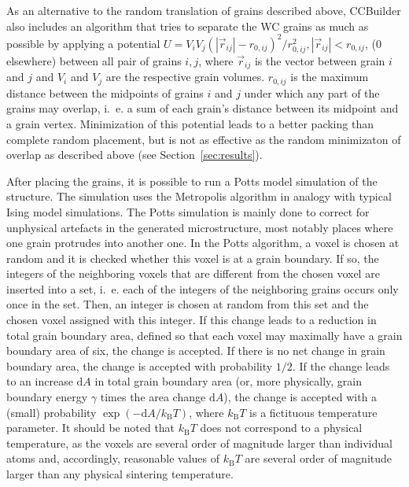 \documentclass[10pt,a4paper]{article}
\begin{document}
As an alternative to the random translation of grains described above, CCBuilder also includes an algorithm that tries to separate the WC grains as much as possible by applying a potential $U = V_i V_j (\left| \vec{r}_{ij} \right| - r_{0,ij})^2 / r_{0,ij}^2, \left|\vec{r}_{ij}\right| < r_{0,ij}$, ($0$ elsewhere) between all pair of grains $i,j$, where $\vec{r}_{ij}$ is the vector between grain $i$ and $j$ and $V_i$ and $V_j$ are the respective grain volumes. $r_{0,ij}$ is the maximum distance between the midpoints of grains $i$ and $j$ under which any part of the grains may overlap, i.~e. a sum of each grain's distance between its midpoint and a grain vertex. Minimization of this potential leads to a better packing than complete random placement, but is not as effective as the random minimizaton of overlap as described above (see Section~\ref{sec:results}).

After placing the grains, it is possible to run a Potts model simulation \cite{HoBa01} of the structure. The simulation uses the Metropolis algorithm in analogy with typical Ising model simulations. The Potts simulation is mainly done to correct for unphysical artefacts in the generated microstructure, most notably places where one grain protrudes into another one. In the Potts algorithm, a voxel is chosen at random and it is checked whether this voxel is at a grain boundary. If so, the integers of the neighboring voxels that are different from the chosen voxel are inserted into a set, i.~e. each of the integers of the neighboring grains occurs only once in the set. Then, an integer is chosen at random from this set and the chosen voxel assigned with this integer. If this change leads to a reduction in total grain boundary area, defined so that each voxel may maximally have a grain boundary area of six, the change is accepted. If there is no net change in grain boundary area, the change is accepted with probability $1/2$. If the change leads to an increase $\text{d}A$ in total grain boundary area (or, more physically, grain boundary energy $\gamma$ times the area change $\text{d}A$), the change is accepted with a (small) probability $\exp(-\text{d}A / k_\text{B} T)$, where $k_\text{B} T$ is a fictituous temperature parameter. It should be noted that $k_\text{B} T$ does not correspond to a physical temperature, as the voxels are several order of magnitude larger than individual atoms and, accordingly, reasonable values of $k_\text{B} T$ are several order of magnitude larger than any physical sintering temperature.
\end{document}
